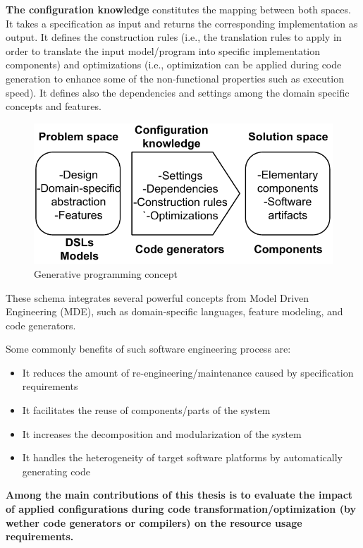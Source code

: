 \textbf{The configuration knowledge} constitutes the mapping between both spaces. It takes a specification as input and returns the corresponding implementation as output. It defines the construction rules (i.e., the translation rules to apply in order to translate the input model/program into specific implementation components) and optimizations (i.e., optimization can be applied during code generation to enhance some of the non-functional properties such as execution speed). It defines also the dependencies and settings among the domain specific concepts and features.

\begin{figure}[h]
	\center
	\includegraphics[scale=0.65]{Background/fig/GDM.pdf}
	\caption{Generative programming concept}
\end{figure}
These schema integrates several powerful concepts from Model Driven Engineering (MDE), such as domain-specific languages, feature modeling, and code generators.

Some commonly benefits of such software engineering process are:
\begin{itemize}
\item It reduces the amount of re-engineering/maintenance caused by specification requirements
\item It facilitates the reuse of components/parts of the system
\item It increases the decomposition and modularization of the system
\item It handles the heterogeneity of target software platforms by automatically generating code
\end{itemize}


\textbf{Among the main contributions of this thesis is to evaluate the impact of applied configurations during code transformation/optimization (by wether code generators or compilers) on the resource usage requirements. 
}


